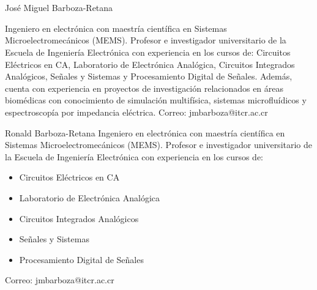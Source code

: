\documentclass[journal]{IEEEtran}
\begin{document}
\section{}
\printbibliography


\begin{IEEEbiography}{José Miguel Barboza-Retana}

Ingeniero en electrónica con maestría científica en Sistemas Microelectromecánicos (MEMS). Profesor e investigador universitario de la Escuela de Ingeniería Electrónica con experiencia en los cursos de: Circuitos Eléctricos en CA, Laboratorio de Electrónica Analógica, Circuitos Integrados Analógicos, Señales y Sistemas y Procesamiento Digital de Señales. Además, cuenta con experiencia en proyectos de investigación relacionados en áreas biomédicas con conocimiento de simulación multifísica, sistemas microfluídicos y espectroscopía por impedancia eléctrica.
Correo: jmbarboza@itcr.ac.cr

\end{IEEEbiography}
 
\begin{IEEEbiographynophoto}{Ronald Barboza-Retana}
Ingeniero en electrónica con maestría científica en Sistemas Microelectromecánicos (MEMS). Profesor e investigador universitario de la Escuela de Ingeniería Electrónica con experiencia en los cursos de:

\begin{itemize}
\item Circuitos Eléctricos en CA
\item Laboratorio de Electrónica Analógica
\item Circuitos Integrados Analógicos
\item Señales y Sistemas
\item Procesamiento Digital de Señales
\end{itemize} 

Correo: jmbarboza@itcr.ac.cr
\end{IEEEbiographynophoto}

\vfill
\end{document}
